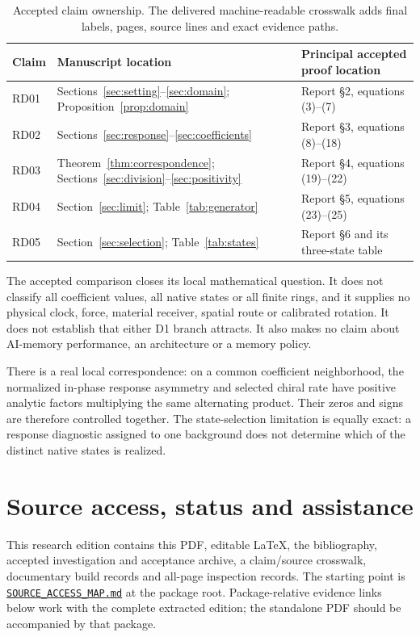 \documentclass[11pt,a4paper]{article}
\numberwithin{equation}{section}
\theoremstyle{remark}\newtheorem{remark}[theorem]{Remark}
\begin{document}
\begin{table}[htbp]\centering\small
\begin{tabularx}{\textwidth}{@{}lYY@{}}\toprule
Claim & Manuscript location & Principal accepted proof location\\\midrule
RD01 & Sections~\ref{sec:setting}--\ref{sec:domain}; Proposition~\ref{prop:domain} & Report \S2, equations (3)--(7)\\[4pt]
RD02 & Sections~\ref{sec:response}--\ref{sec:coefficients} & Report \S3, equations (8)--(18)\\[4pt]
RD03 & Theorem~\ref{thm:correspondence}; Sections~\ref{sec:division}--\ref{sec:positivity} & Report \S4, equations (19)--(22)\\[4pt]
RD04 & Section~\ref{sec:limit}; Table~\ref{tab:generator} & Report \S5, equations (23)--(25)\\[4pt]
RD05 & Section~\ref{sec:selection}; Table~\ref{tab:states} & Report \S6 and its three-state table\\\bottomrule
\end{tabularx}
\caption{Accepted claim ownership. The delivered machine-readable crosswalk adds final labels, pages, source lines and exact evidence paths.}\label{tab:crosswalk}
\end{table}

The accepted comparison closes its local mathematical question. It does not classify all coefficient values, all native states or all finite rings, and it supplies no physical clock, force, material receiver, spatial route or calibrated rotation. It does not establish that either D1 branch attracts. It also makes no claim about AI-memory performance, an architecture or a memory policy.

There is a real local correspondence: on a common coefficient neighborhood, the normalized in-phase response asymmetry and selected chiral rate have positive analytic factors multiplying the same alternating product. Their zeros and signs are therefore controlled together. The state-selection limitation is equally exact: a response diagnostic assigned to one background does not determine which of the distinct native states is realized.

\clearpage
\section*{Source access, status and assistance}\label{sec:access}
This research edition contains this PDF, editable LaTeX, the bibliography, accepted investigation and acceptance archive, a claim/source crosswalk, documentary build records and all-page inspection records. The starting point is \href{SOURCE_ACCESS_MAP.md}{\texttt{SOURCE\_ACCESS\_MAP.md}} at the package root. Package-relative evidence links below work with the complete extracted edition; the standalone PDF should be accompanied by that package.
\end{document}
